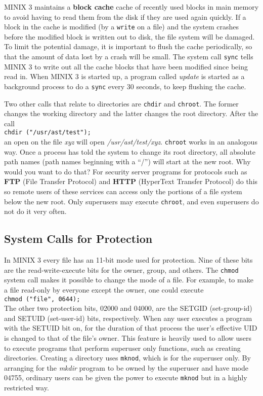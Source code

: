 \documentclass{book}
\newcommand {\kw}  [1] {\textbf{#1}}
\newcommand {\sys} [1] {\textsl{#1}}
\newcommand {\cmd} [1] {\texttt{#1}}
\begin{document}
MINIX 3 maintains a \kw{block cache} cache of recently used blocks in main memory to avoid having to read them from the disk
if they are used again quickly.
If a block in the cache is modified (by a \cmd{write} on a file) and the system crashes before the modified block is written out to disk, 
the file system will be damaged.
To limit the potential damage, it is important to flush the cache periodically,
so that the amount of data lost by a crash will be small.
The system call \cmd{sync} tells MINIX 3 to write out all the cache blocks that have been modified since being read in.
When MINIX 3 is started up, a program called \sys{update} is started as a background process 
to do a \cmd{sync} every 30 seconds, to keep flushing the cache.

Two other calls that relate to directories are \cmd{chdir} and \cmd{chroot}.
The former changes the working directory and the latter changes the root directory.
After the call\\
\cmd{chdir ("/usr/ast/test");}\\
an open on the file \sys{xyz} will open \sys{/usr/ast/test/xyz}.
\cmd{chroot} works in an analogous way.
Once a process has told the system to change its root directory, 
all absolute path names (path names beginning with a ``/'') will start at the new root.
Why would you want to do that?
For security server programs for protocols such as \kw{FTP} (File Transfer Protocol) and \kw{HTTP} (HyperText Transfer Protocol) 
do this so remote users of these services can access only the portions of a file system below the new root.
Only superusers may execute \cmd{chroot}, and even superusers do not do it very often.

\subsection{System Calls for Protection}
In MINIX 3 every file has an 11-bit mode used for protection.
Nine of these bits are the read-write-execute bits for the owner, group, and others.
The \cmd{chmod} system call makes it possible to change the mode of a file.
For example, to make a file read-only by everyone except the owner, one could execute\\
\cmd{chmod ("file", 0644);}\\
The other two protection bits, 02000 and 04000, are the SETGID (set-group-id) and SETUID (set-user-id) bits, respectively.
When any user executes a program with the SETUID bit on, 
for the duration of that process the user's effective UID is changed to that of the file's owner.
This feature is heavily used to allow users to execute programs that perform superuser only functions, such as creating directories.
Creating a directory uses \cmd{mknod}, which is for the superuser only.
By arranging for the \sys{mkdir} program to be owned by the superuser and have mode 04755, 
ordinary users can be given the power to execute \cmd{mknod} but in a highly restricted way.
\end{document}
